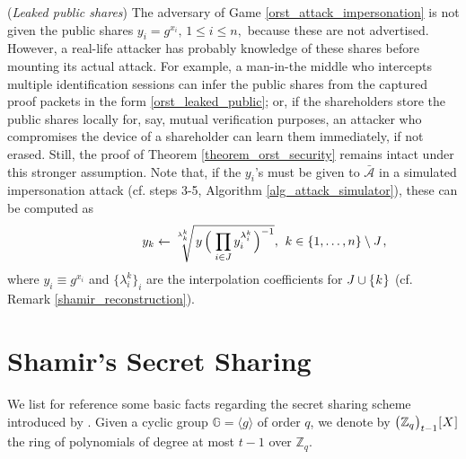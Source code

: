 \documentclass{iacrtrans}
\begin{document}
\begin{rem}\label{rem_leaked_public_shares}
(\textit{Leaked public shares})
The adversary of Game \ref{orst_attack_impersonation}
is not given the public shares
$y_i = g ^ {x_i},\hspace{2pt} 1 \le i \le n,$
because these are not advertised.
However, a real-life attacker has probably
knowledge of these shares before mounting
its actual attack.
For example, a man-in-the middle who intercepts multiple
identification sessions can infer the public shares
from the captured proof packets in the form
\eqref{orst_leaked_public};
or, if the shareholders store the public shares
locally for, say, mutual verification purposes,
an attacker who compromises the device of a shareholder
can learn them immediately, if not erased.
Still, the proof of Theorem \ref{theorem_orst_security}
remains intact under this stronger assumption.
Note that, if the $y_i$'s must be given to $\mathcal{\bar{A}}$
in a simulated impersonation attack
(cf. steps 3-5, Algorithm \ref{alg_attack_simulator}),
these can be computed as
\vspace{5pt}
\begin{equation*}
\hspace{50pt}
y_k \leftarrow
\sqrt[\leftroot{0}\uproot{10}\lambda_k^k]{\hspace{1.5pt}y\hspace{1.5pt}
\Big(\hspace{1pt}\prod_{i \in J} y_i^{\lambda_i^k}\hspace{1pt}\Big)^{-1}},
\hspace{4pt} k \in \{1, \dots, n\} \setminus J\hspace{1pt},
\vspace{5pt}
\end{equation*}
where $y_i \equiv g ^ {x_i}$ and $\{\lambda_i^k\}_i$
are the interpolation coefficients for
$J \cup \{\hspace{0.5pt}k\hspace{0.5pt}\}$
(cf. Remark \ref{shamir_reconstruction}).
\end{rem}

\appendix

\section{Shamir's Secret Sharing}\label{section_shamir}

\noindent
We list for reference some basic facts regarding
the secret sharing scheme introduced by \cite{paper_shamir}.
Given a cyclic group $\mathbb{G} = \langle g \rangle$ of order $q$,
we denote by
$
\big(
	\hspace{0.3pt}
	\mathbb{Z}_q
	\hspace{0.3pt}
	\big)_{t-1}
	\hspace{0.3pt}
	[
		\hspace{0.5pt}
		X
		\hspace{0.5pt}
	]
$
the ring of polynomials of degree
at most $t-1$ over $\mathbb{Z}_q$.
\end{document}
